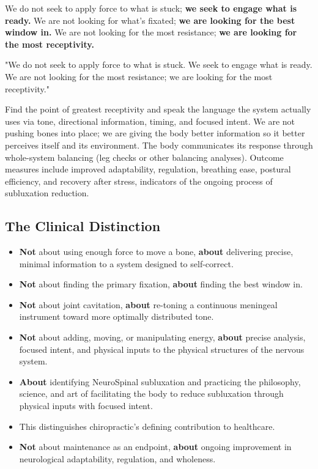 \documentclass[11pt,letterpaper]{article}
\begin{document}
We do not seek to apply force to what is stuck; \textbf{we seek to engage what is ready.} We are not looking for what's fixated; \textbf{we are looking for the best window in.} We are not looking for the most resistance; \textbf{we are looking for the most receptivity.}


\begin{pullquotebox}
"We do not seek to apply force to what is stuck. We seek to engage what is ready. We are not looking for the most resistance; we are looking for the most receptivity."
\end{pullquotebox}

Find the point of greatest receptivity and speak the language the system actually uses via tone, directional information, timing, and focused intent. We are not pushing bones into place; we are giving the body better information so it better perceives itself and its environment. The body communicates its response through whole-system balancing (leg checks or other balancing analyses). Outcome measures include improved adaptability, regulation, breathing ease, postural efficiency, and recovery after stress, indicators of the ongoing process of subluxation reduction.


\subsection{The Clinical Distinction}

\begin{itemize}
\item \textbf{Not} about using enough force to move a bone, \textbf{about} delivering precise, minimal information to a system designed to self-correct.
\item \textbf{Not} about finding the primary fixation, \textbf{about} finding the best window in.
\item \textbf{Not} about joint cavitation, \textbf{about} re-toning a continuous meningeal instrument toward more optimally distributed tone.
\item \textbf{Not} about adding, moving, or manipulating energy, \textbf{about} precise analysis, focused intent, and physical inputs to the physical structures of the nervous system.
\item \textbf{About} identifying NeuroSpinal subluxation and practicing the philosophy, science, and art of facilitating the body to reduce subluxation through physical inputs with focused intent.
\item This distinguishes chiropractic's defining contribution to healthcare.
\item \textbf{Not} about maintenance as an endpoint, \textbf{about} ongoing improvement in neurological adaptability, regulation, and wholeness.
\end{itemize}
\end{document}
